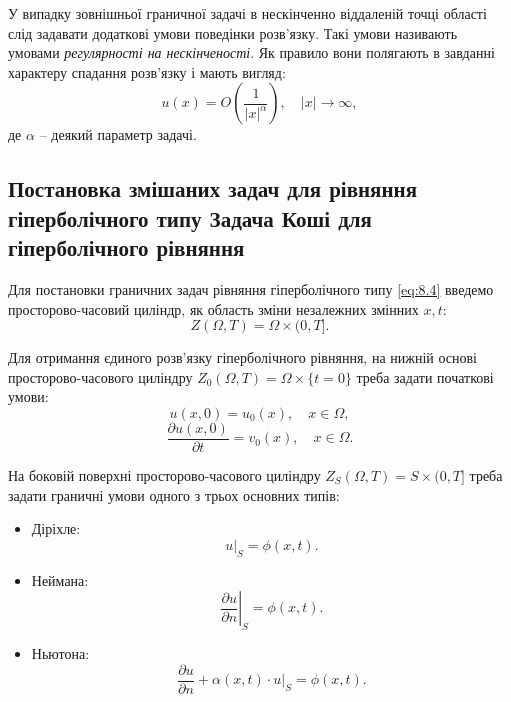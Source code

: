 У випадку зовнішньої граничної задачі в нескінченно віддаленій точці області слід задавати додаткові умови поведінки розв'язку. Такі умови називають умовами \textit{регулярності на нескінченості}. Як правило вони полягають в завданні характеру спадання розв'язку і мають вигляд: 
\begin{equation}
	\label{eq:8.9}
	u(x) = O \left( \frac{1}{|x|^\alpha} \right), \quad |x| \to \infty,
\end{equation}
де $\alpha$ -- деякий параметр задачі.

\subsection{Постановка змішаних задач для рівняння гіперболічного типу Задача Коші для гіперболічного рівняння}

Для постановки граничних задач рівняння гіперболічного типу \eqref{eq:8.4} введемо просторово-часовий циліндр, як область зміни незалежних змінних $x, t$:
\begin{equation}
	\label{eq:8.11}
	Z(\Omega, T) = \Omega \times (0, T].
\end{equation}

Для отримання єдиного розв'язку гіперболічного рівняння, на нижній основі просторово-часового циліндру $Z_0(\Omega, T) = \Omega \times \{t = 0\}$ треба задати початкові умови:
\begin{equation}
	\label{eq:8.12}
	u(x, 0) = u_0(x), \quad x \in \Omega,
\end{equation}
\begin{equation}
	\label{eq:8.13}
	\frac{\partial u(x, 0)}{\partial t} = v_0(x), \quad x \in \Omega.
\end{equation}

На боковій поверхні просторово-часового циліндру $Z_S (\Omega, T) = S \times (0, T]$ треба задати граничні умови одного з трьох основних типів:
\begin{itemize}
	\item Діріхле: 
	\begin{equation}
		\label{eq:8.14}
		u|_S = \phi(x, t).
	\end{equation}
	\item Неймана:
	\begin{equation}
		\label{eq:8.15}
		\left. \frac{\partial u}{\partial n} \right|_S = \phi(x, t).
	\end{equation}
	\item Ньютона:
	\begin{equation}
		\label{eq:8.16}
		\frac{\partial u}{\partial n} + \alpha(x, t) \cdot u|_S = \phi(x, t).
	\end{equation}
\end{itemize}

